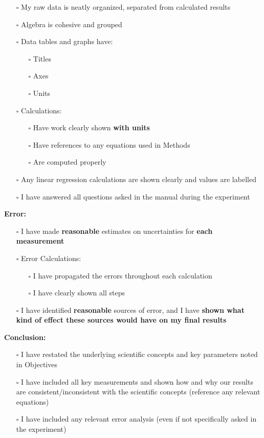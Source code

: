 \begin{itemize}
    \item[$\square$] My raw data is neatly organized, separated from calculated results
    \item[$\square$] Algebra is cohesive and grouped
    \item[$\square$] Data tables and graphs have:
	\begin{itemize}
	    \item[$\square$] Titles
	    \item[$\square$] Axes
	    \item[$\square$] Units
	\end{itemize}
    \item[$\square$] Calculations:
        \begin{itemize}
	    \item[$\square$] Have work clearly shown \textbf{with units}
	    \item[$\square$] Have references to any equations used in Methods
	    \item[$\square$] Are computed properly
	\end{itemize}
    \item[$\square$] Any linear regression calculations are shown clearly and values are labelled
    \item[$\square$] I have answered all questions asked in the manual during the experiment
\end{itemize}  
\textbf{Error:}
\begin{itemize}
    \item[$\square$] I have made \textbf{reasonable} estimates on uncertainties for \textbf{each measurement}
    \item[$\square$] Error Calculations:
        \begin{itemize}
	    \item[$\square$] I have propagated the errors throughout each calculation
	    \item[$\square$] I have clearly shown all steps
	\end{itemize}
    \item[$\square$] I have identified \textbf{reasonable} sources of error, and I have \textbf{shown what kind of effect these sources would have on my final results}
\end{itemize}  
\textbf{Conclusion:}
\begin{itemize}
    \item[$\square$] I have restated the underlying scientific concepts and key parameters noted in Objectives
    \item[$\square$] I have included all key measurements and shown how and why our results are consistent/inconsistent with the scientific concepts (reference any relevant equations)
    \item[$\square$] I have included any relevant error analysis (even if not specifically asked in the experiment)
\end{itemize}  
